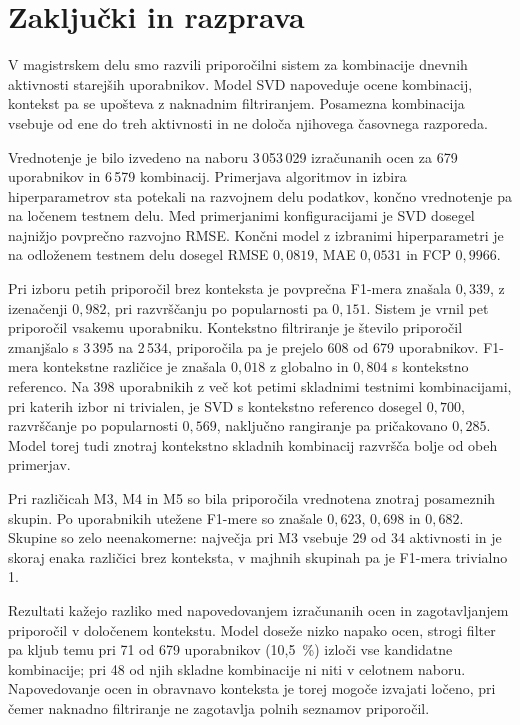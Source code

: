\documentclass[a4paper,twoside,openright,12pt,slovene]{book}
\begin{document}
\chapter{Zaključki in razprava} \label{chap:discussion_conclusion}
V magistrskem delu smo razvili priporočilni sistem za
kombinacije dnevnih aktivnosti starejših uporabnikov.
Model SVD napoveduje ocene kombinacij, kontekst pa se
upošteva z naknadnim filtriranjem. Posamezna kombinacija
vsebuje od ene do treh aktivnosti in ne določa njihovega
časovnega razporeda.

Vrednotenje je bilo izvedeno na naboru 3\,053\,029
izračunanih ocen za 679 uporabnikov in 6\,579 kombinacij.
Primerjava algoritmov in izbira hiperparametrov sta
potekali na razvojnem delu podatkov, končno vrednotenje
pa na ločenem testnem delu.
Med primerjanimi konfiguracijami je SVD dosegel
najnižjo povprečno razvojno RMSE.
Končni model z izbranimi hiperparametri je na
odloženem testnem delu dosegel RMSE $0{,}0819$,
MAE $0{,}0531$ in FCP $0{,}9966$.

Pri izboru petih priporočil brez konteksta je povprečna
F1-mera znašala $0{,}339$, z izenačenji $0{,}982$, pri razvrščanju
po popularnosti pa $0{,}151$. Sistem je vrnil pet priporočil
vsakemu uporabniku. Kontekstno filtriranje je število
priporočil zmanjšalo s 3\,395 na 2\,534, priporočila
pa je prejelo 608 od 679 uporabnikov.
F1-mera kontekstne različice je znašala
$0{,}018$ z globalno in $0{,}804$ s kontekstno referenco.
Na 398 uporabnikih z več kot petimi skladnimi testnimi kombinacijami,
pri katerih izbor ni trivialen, je SVD s kontekstno referenco dosegel
$0{,}700$, razvrščanje po popularnosti $0{,}569$, naključno rangiranje
pa pričakovano $0{,}285$. Model torej tudi znotraj kontekstno skladnih
kombinacij razvršča bolje od obeh primerjav.

Pri različicah M3, M4 in M5 so bila priporočila
vrednotena znotraj posameznih skupin.
Po uporabnikih utežene F1-mere so znašale $0{,}623$, $0{,}698$
in $0{,}682$. Skupine so zelo neenakomerne: največja pri M3 vsebuje
29 od 34 aktivnosti in je skoraj enaka različici brez konteksta, v majhnih
skupinah pa je F1-mera trivialno 1.

Rezultati kažejo razliko med napovedovanjem izračunanih
ocen in zagotavljanjem priporočil v določenem kontekstu.
Model doseže nizko napako ocen, strogi filter pa
kljub temu pri 71 od 679 uporabnikov (10,5~\%) izloči vse
kandidatne kombinacije; pri 48 od njih skladne kombinacije ni
niti v celotnem naboru. Napovedovanje ocen
in obravnavo konteksta je torej mogoče izvajati ločeno, pri čemer
naknadno filtriranje ne zagotavlja polnih seznamov priporočil.
\end{document}
